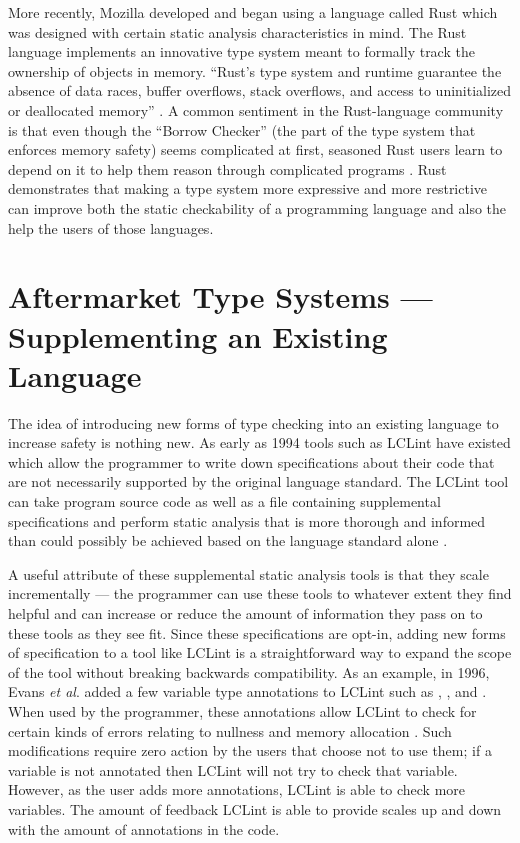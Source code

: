 More recently, Mozilla developed and began using a language called Rust which was designed with certain static analysis characteristics in mind.  The Rust language implements an innovative type system meant to formally track the ownership of objects in memory.  ``Rust's type system and runtime guarantee the absence of data races, buffer overflows, stack overflows, and access to uninitialized or deallocated memory'' \cite{rust-is-dope}.  A common sentiment in the Rust-language community is that even though the ``Borrow Checker'' (the part of the type system that enforces memory safety) seems complicated at first, seasoned Rust users learn to depend on it to help them reason through complicated programs  \cite{rust-lang-spec}.  Rust demonstrates that making a type system more expressive and more restrictive can improve both the static checkability of a programming language and also the help the users of those languages.  

\section{Aftermarket Type Systems --- Supplementing an Existing Language}\label{sec:related:aftermarket}

The idea of introducing new forms of type checking into an existing language to increase safety is nothing new.  As early as 1994 tools such as LCLint have existed which allow the programmer to write down specifications about their code that are not necessarily supported by the original language standard.  The LCLint tool can take program source code as well as a file containing supplemental specifications and perform static analysis that is more thorough and informed than could possibly be achieved based on the language standard alone \cite{lclint-og}. 

A useful attribute of these supplemental static analysis tools is that they scale incrementally --- the programmer can use these tools to whatever extent they find helpful and can increase or reduce the amount of information they pass on to these tools as they see fit.  Since these specifications are opt-in, adding new forms of specification to a tool like LCLint is a straightforward way to expand the scope of the tool without breaking backwards compatibility.  As an example, in 1996, Evans \textit{et al}. added a few variable type annotations to LCLint such as , , and .  When used by the programmer, these annotations allow LCLint to check for certain kinds of errors relating to nullness and memory allocation \cite{lclint-memory}.  Such modifications require zero action by the users that choose not to use them; if a variable is not annotated then LCLint will not try to check that variable.  However, as the user adds more annotations, LCLint is able to check more variables.  The amount of feedback LCLint is able to provide scales up and down with the amount of annotations in the code.  

